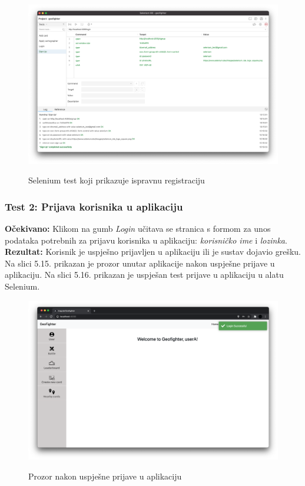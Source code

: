			\begin{figure}[H]
				\centering
				\includegraphics[scale=0.27]{dokumentacija/slike/SeleniumRegistrationTest.png} \\
				\caption{ Selenium test koji prikazuje ispravnu registraciju}
				\label{fig:SeleniumRegistrationTest}
			\end{figure}

			\subsubsection{Test 2: Prijava korisnika u aplikaciju}
			\textbf{Očekivano: } Klikom na gumb \textit{Login} učitava se stranica s formom za unos podataka potrebnih za prijavu korisnika u aplikaciju: \textit{korisničko ime} i \textit{lozinka}.\\
			\textbf{Rezultat: } Korisnik  je  uspješno  prijavljen u aplikaciju ili  je  sustav  dojavio grešku.\\

			    Na slici 5.15. prikazan je prozor unutar aplikacije nakon uspješne prijave u aplikaciju. Na slici 5.16. prikazan je uspješan test prijave u aplikaciju u alatu Selenium.

			\begin{figure}[H]
				\centering
				\includegraphics[scale=0.27]{dokumentacija/slike/SeleniumLoginSuccess.png} \\
				\caption{ Prozor nakon uspješne prijave u aplikaciju}
				\label{fig:SeleniumLoginSuccess}
			\end{figure}

